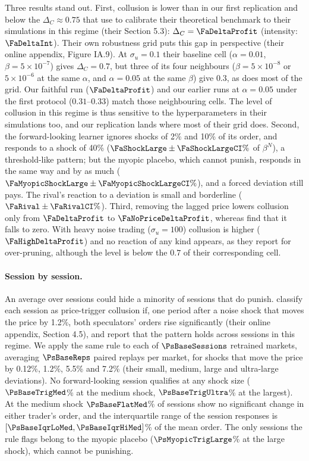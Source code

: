 Three results stand out. First, collusion is lower than in our first
replication and below the $\Delta_C\approx0.75$ that \citet{dou2025} use to
calibrate their theoretical benchmark to their simulations in this regime
(their Section 5.3): $\Delta_C=\FaDeltaProfit$ (intensity: $\FaDeltaInt$).
Their own robustness grid puts this gap in perspective (their online
appendix, Figure IA.9). At $\sigma_u=0.1$ their baseline cell
($\alpha=0.01$, $\beta=5\times10^{-7}$) gives $\Delta_C=0.7$, but three of
its four neighbours ($\beta=5\times10^{-8}$ or $5\times10^{-6}$ at the same
$\alpha$, and $\alpha=0.05$ at the same $\beta$) give $0.3$, as does most of
the grid. Our faithful run ($\FaDeltaProfit$) and our earlier runs at
$\alpha=0.05$ under the first protocol ($0.31$--$0.33$) match those
neighbouring cells. The level of
collusion in this regime is thus sensitive to the hyperparameters in their
simulations too, and our replication lands where most of their grid does. Second, the
forward-looking learner ignores shocks of 2\% and 10\% of its order, and
responds to a shock of 40\% ($\FaShockLarge\pm\FaShockLargeCI\%$ of $\beta^N$),
a threshold-like pattern; but the myopic placebo, which cannot punish,
responds in the same way and by as much
($\FaMyopicShockLarge\pm\FaMyopicShockLargeCI\%$), and a forced deviation
still pays. The rival's reaction to a deviation is small and borderline
($\FaRival\pm\FaRivalCI\%$). Third, removing the lagged price lowers
collusion only from $\FaDeltaProfit$ to $\FaNoPriceDeltaProfit$, whereas
\citet{dou2025} find that it falls to zero. With heavy noise trading
($\sigma_u=100$) collusion is higher ($\FaHighDeltaProfit$) and no reaction of
any kind appears, as they report for over-pruning, although the level is
below the $0.7$ of their corresponding cell.

\paragraph{Session by session.} An average over sessions could hide a
minority of sessions that do punish. \citet{dou2025} classify each session as
price-trigger collusion if, one period after a noise shock that moves the
price by 1.2\%, both speculators' orders rise significantly (their online
appendix, Section 4.5), and report that the pattern holds across sessions in
this regime. We apply the same rule to each of $\PsBaseSessions$ retrained
markets, averaging $\PsBaseReps$ paired replays per market, for shocks that
move the price by 0.12\%, 1.2\%, 5.5\% and 7.2\% (their small, medium, large
and ultra-large deviations). No forward-looking session qualifies at any shock
size ($\PsBaseTrigMed$\% at the medium shock, $\PsBaseTrigUltra$\% at the
largest). At the medium shock $\PsBaseFlatMed$\% of sessions show no
significant change in either trader's order, and the interquartile range of
the session responses is $[\PsBaseIqrLoMed, \PsBaseIqrHiMed]$\% of the
mean order. The only sessions the rule flags belong to the myopic placebo
($\PsMyopicTrigLarge$\% at the large shock), which cannot be punishing.

